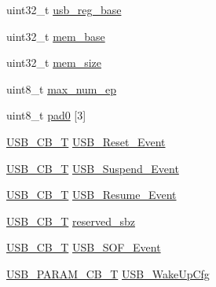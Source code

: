 \begin{DoxyCompactItemize}
\item 
uint32\+\_\+t \hyperlink{struct_u_s_b_d___a_p_i___i_n_i_t___p_a_r_a_m_a171d80187485a767c4fdf4dc4c4f330a}{usb\+\_\+reg\+\_\+base}
\item 
uint32\+\_\+t \hyperlink{struct_u_s_b_d___a_p_i___i_n_i_t___p_a_r_a_m_ac3209246722c2395c476c82d0e76c879}{mem\+\_\+base}
\item 
uint32\+\_\+t \hyperlink{struct_u_s_b_d___a_p_i___i_n_i_t___p_a_r_a_m_a237d34b2303d35b80c7ebb9c58326bf9}{mem\+\_\+size}
\item 
uint8\+\_\+t \hyperlink{struct_u_s_b_d___a_p_i___i_n_i_t___p_a_r_a_m_a168996cbd91b47939fe823bf0bf7cbe0}{max\+\_\+num\+\_\+ep}
\item 
uint8\+\_\+t \hyperlink{struct_u_s_b_d___a_p_i___i_n_i_t___p_a_r_a_m_ab537ed0a84e63aaf79592e8bd500c79c}{pad0} \mbox{[}3\mbox{]}
\item 
\hyperlink{group___u_s_b_d___core_ga0404ce046312aa5c798cc4a05c417e46}{U\+S\+B\+\_\+\+C\+B\+\_\+T} \hyperlink{struct_u_s_b_d___a_p_i___i_n_i_t___p_a_r_a_m_a49f0d2a8b163486e07cfea83b436234f}{U\+S\+B\+\_\+\+Reset\+\_\+\+Event}
\item 
\hyperlink{group___u_s_b_d___core_ga0404ce046312aa5c798cc4a05c417e46}{U\+S\+B\+\_\+\+C\+B\+\_\+T} \hyperlink{struct_u_s_b_d___a_p_i___i_n_i_t___p_a_r_a_m_a3c256417cf3bdd576029d29787d6046f}{U\+S\+B\+\_\+\+Suspend\+\_\+\+Event}
\item 
\hyperlink{group___u_s_b_d___core_ga0404ce046312aa5c798cc4a05c417e46}{U\+S\+B\+\_\+\+C\+B\+\_\+T} \hyperlink{struct_u_s_b_d___a_p_i___i_n_i_t___p_a_r_a_m_a2fb170236fa92a20f29dc8c13b24a1d1}{U\+S\+B\+\_\+\+Resume\+\_\+\+Event}
\item 
\hyperlink{group___u_s_b_d___core_ga0404ce046312aa5c798cc4a05c417e46}{U\+S\+B\+\_\+\+C\+B\+\_\+T} \hyperlink{struct_u_s_b_d___a_p_i___i_n_i_t___p_a_r_a_m_a8470d3c0f29b31408ffa46dd4a4bd74a}{reserved\+\_\+sbz}
\item 
\hyperlink{group___u_s_b_d___core_ga0404ce046312aa5c798cc4a05c417e46}{U\+S\+B\+\_\+\+C\+B\+\_\+T} \hyperlink{struct_u_s_b_d___a_p_i___i_n_i_t___p_a_r_a_m_af6f224a6b2ddee3c5b2056a62fa84914}{U\+S\+B\+\_\+\+S\+O\+F\+\_\+\+Event}
\item 
\hyperlink{group___u_s_b_d___core_ga7df622c61ebb152b83dd5972ac789b28}{U\+S\+B\+\_\+\+P\+A\+R\+A\+M\+\_\+\+C\+B\+\_\+T} \hyperlink{struct_u_s_b_d___a_p_i___i_n_i_t___p_a_r_a_m_a3166b630a5aa02ca07bd3df8496aba5b}{U\+S\+B\+\_\+\+Wake\+Up\+Cfg}
\item 

\end{DoxyCompactItemize}

